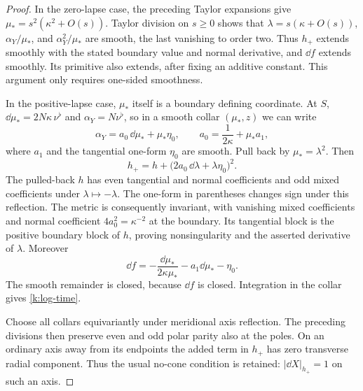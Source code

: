 \begin{proof}
In the zero-lapse case, the preceding Taylor expansions give
\(\mu_*=s^2(\kappa^2+O(s))\). Taylor division on \(s\ge0\) shows that
\(\lambda=s(\kappa+O(s))\), \(\alpha_Y/\mu_*\), and
\(\alpha_Y^2/\mu_*\) are smooth, the last vanishing to order two.
Thus \(h_+\) extends smoothly with the stated boundary value and
normal derivative, and \(\dd f\) extends smoothly. Its primitive
also extends, after fixing an additive constant. This argument
only requires one-sided smoothness.

In the positive-lapse case, \(\mu_*\) itself is a boundary defining
coordinate. At \(S\),
\(\dd\mu_*=2N\kappa\,\nu^\flat\) and
\(\alpha_Y=N\nu^\flat\), so in a smooth collar \((\mu_*,z)\) we can
write
\[
 \alpha_Y=a_0\,\dd\mu_*+\mu_*\eta_0,\qquad
 a_0=\frac1{2\kappa}+\mu_*a_1 ,
\]
where \(a_1\) and the tangential one-form \(\eta_0\) are smooth.
Pull back by \(\mu_*=\lambda^2\). Then
\begin{equation}\label{k:reflected-base}
 h_+=h+\bigl(2a_0\,\dd\lambda+\lambda\eta_0\bigr)^2 .
\end{equation}
The pulled-back \(h\) has even tangential and normal coefficients
and odd mixed coefficients under \(\lambda\mapsto-\lambda\).
The one-form in parentheses changes sign under this reflection.
The metric is consequently invariant, with vanishing mixed
coefficients and normal coefficient \(4a_0^2=\kappa^{-2}\) at the
boundary. Its tangential block is the positive boundary block of
\(h\), proving nonsingularity and the asserted derivative of
\(\lambda\). Moreover
\[
 \dd f=-\frac{\dd\mu_*}{2\kappa\mu_*}
                   -a_1\dd\mu_*-\eta_0.
\]
The smooth remainder is closed, because \(\dd f\) is closed.
Integration in the collar gives \eqref{k:log-time}.

Choose all collars equivariantly under meridional axis reflection.
The preceding divisions then preserve even and odd polar parity
also at the poles. On an ordinary axis away from its endpoints
the added term in \(h_+\) has zero transverse radial component.
Thus the usual no-cone condition is retained:
\(|\dd X|_{h_+}=1\) on such an axis.


\end{proof}
